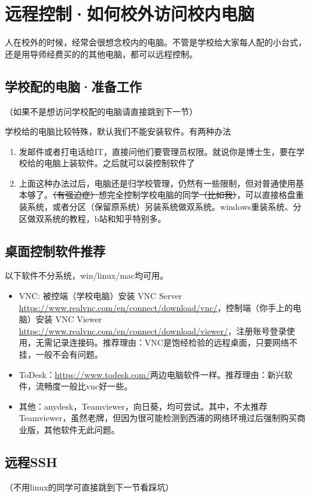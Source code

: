 \section{远程控制·如何校外访问校内电脑}

人在校外的时候，经常会很想念校内的电脑。不管是学校给大家每人配的小台式，还是用导师经费买的的其他电脑，都可以远程控制。

\subsection{学校配的电脑·准备工作}
（如果不是想访问学校配的电脑请直接跳到下一节）

学校给的电脑比较特殊，默认我们不能安装软件。有两种办法
\begin{enumerate}
    \item 发邮件或者打电话给IT，直接问他们要管理员权限。就说你是博士生，要在学校给的电脑上装软件。之后就可以装控制软件了
    \item 上面这种办法过后，电脑还是归学校管理，仍然有一些限制，但对普通使用基本够了。\sout{（有强迫症）}想完全控制学校电脑的同学\sout{（比如我）}，可以直接格盘重装系统，或者分区（保留原系统）另装系统做双系统。windows重装系统、分区做双系统的教程，b站和知乎特别多。
\end{enumerate}

\subsection{桌面控制软件推荐}
以下软件不分系统，win/linux/mac均可用。
\begin{itemize}
    \item VNC: 被控端（学校电脑）安装 VNC Server \url{https://www.realvnc.com/en/connect/download/vnc/}，控制端（你手上的电脑）安装 VNC Viewer \url{https://www.realvnc.com/en/connect/download/viewer/}，注册账号登录使用，无需记录连接码。推荐理由：VNC是饱经检验的远程桌面，只要网络不挂，一般不会有问题。
    \item ToDesk：\url{https://www.todesk.com/}两边电脑软件一样。推荐理由：新兴软件，流畅度一般比vnc好一些。
    \item 其他：anydesk，Teamviewer，向日葵，均可尝试。其中，不太推荐Teamviewer，虽然老牌，但因为很可能检测到西浦的网络环境过后强制购买商业版，其他软件无此问题。
\end{itemize}

\subsection{远程SSH}
（不用linux的同学可直接跳到下一节看踩坑）

